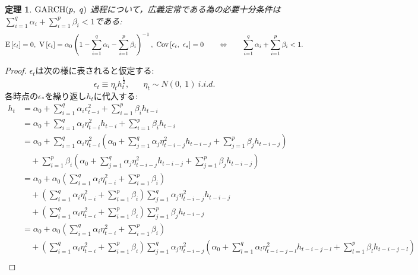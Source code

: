 \documentclass[8pt]{jsarticle}
\newtheorem{prop}{定理}
\newtheorem{proof}{証明}
\def\Exp#1{\mbox{${\rm E} \left[ #1 \right]$}}
\def\Var#1{\mbox{${\rm V} \left[ #1 \right]$}}
\def\Cov#1#2{\mbox{${\rm Cov} \left[ #1,\ #2 \right]$}}
\begin{document}
\begin{boxnote}
	\begin{prop}
	${\rm GARCH}(p,\ q)$ 過程について，広義定常である為の必要十分条件は$\sum_{i=1}^{q} \alpha_i + \sum_{i=1}^{p} \beta_i < 1$である:
	\[
		\Exp{\epsilon_t}=0,\ \Var{\epsilon_t}=\alpha_0 \left( 1 - \sum_{i=1}^{q} \alpha_i - \sum_{i=1}^{p} \beta_i \right)^{-1},\ \Cov{\epsilon_t}{\epsilon_s}=0
		\hspace{20pt} \Leftrightarrow \hspace{20pt}
		\sum_{i=1}^{q} \alpha_i + \sum_{i=1}^{p} \beta_i < 1.
	\]
	\end{prop}
\end{boxnote}
\begin{proof}
$\epsilon_t$は次の様に表されると仮定する:
\[
	\epsilon_t \equiv \eta_t h_t^{\frac{1}{2}}, \hspace{20pt} \eta_t \sim N(0,\ 1)\ i.i.d.
\]
各時点の$\epsilon_*$を繰り返し$h_t$に代入する:
\begin{align*}
	h_t &= \alpha_0 + \sum_{i=1}^{q} \alpha_i \epsilon_{t-i}^2 + \sum_{i=1}^{p} \beta_i h_{t-i} \\
	&= \alpha_0 + \sum_{i=1}^{q} \alpha_i \eta_{t-i}^2 h_{t-i} + \sum_{i=1}^{p} \beta_i h_{t-i} \\
	&= \alpha_0 + \sum_{i=1}^{q} \alpha_i \eta_{t-i}^2 \left( \alpha_0 + \sum_{j=1}^{q} \alpha_j \eta_{t-i-j}^2 h_{t-i-j} + \sum_{j=1}^{p} \beta_j h_{t-i-j} \right)\\
		&\quad+ \sum_{i=1}^{p} \beta_i \left( \alpha_0 + \sum_{j=1}^{q} \alpha_j \eta_{t-i-j}^2 h_{t-i-j} + \sum_{j=1}^{p} \beta_j h_{t-i-j} \right) \\
	&= \alpha_0 + \alpha_0 \left( \sum_{i=1}^{q} \alpha_i \eta_{t-i}^2 + \sum_{i=1}^{p} \beta_i \right) \\
		&\quad+ \left( \sum_{i=1}^{q} \alpha_i \eta_{t-i}^2 + \sum_{i=1}^{p} \beta_i \right) \sum_{j=1}^{q} \alpha_j \eta_{t-i-j}^2 h_{t-i-j} \\
		&\quad+ \left( \sum_{i=1}^{q} \alpha_i \eta_{t-i}^2 + \sum_{i=1}^{p} \beta_i \right) \sum_{j=1}^{p} \beta_j h_{t-i-j} \\
	&= \alpha_0 + \alpha_0 \left( \sum_{i=1}^{q} \alpha_i \eta_{t-i}^2 + \sum_{i=1}^{p} \beta_i \right) \\
		&\quad+ \left( \sum_{i=1}^{q} \alpha_i \eta_{t-i}^2 + \sum_{i=1}^{p} \beta_i \right) \sum_{j=1}^{q} \alpha_j \eta_{t-i-j}^2 \left( \alpha_0 + \sum_{l=1}^{q} \alpha_l \eta_{t-i-j-l}^2 h_{t-i-j-l} + \sum_{l=1}^{p} \beta_l h_{t-i-j-l} \right) \\

\end{align*}
\end{proof}
\end{document}
